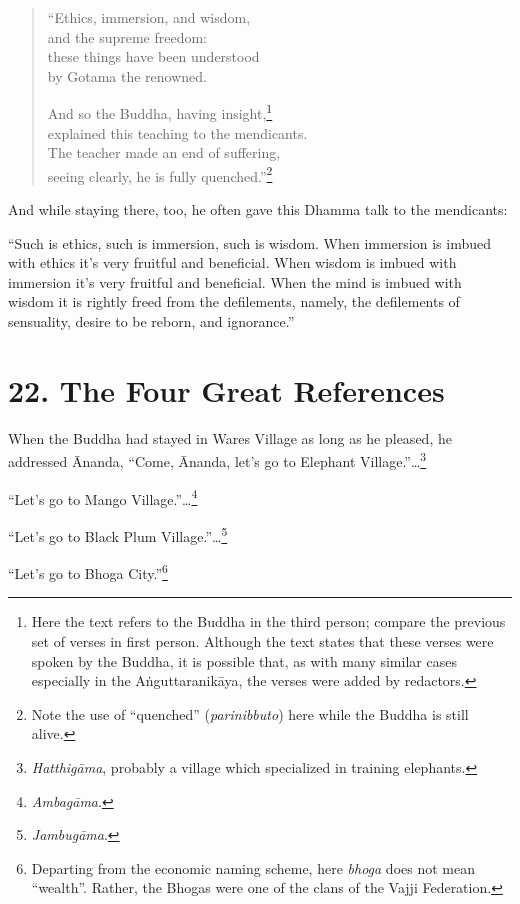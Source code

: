 \documentclass[12pt,openany]{book}%
\begin{document}
\begin{verse}%
“Ethics, immersion, and wisdom, \\
and the supreme freedom: \\
these things have been understood \\
by Gotama the renowned. 

And so the Buddha, having insight,\footnote{Here the text refers to the Buddha in the third person; compare the previous set of verses in first person. Although the text states that these verses were spoken by the Buddha, it is possible that, as with many similar cases especially in the \textsanskrit{Aṅguttaranikāya}, the verses were added by redactors. } \\
explained this teaching to the mendicants. \\
The teacher made an end of suffering, \\
seeing clearly, he is fully quenched.”\footnote{Note the use of “quenched” (\textit{parinibbuto}) here while the Buddha is still alive. } 

%
\end{verse}

And while staying there, too, he often gave this Dhamma talk to the mendicants: 

“Such is ethics, such is immersion, such is wisdom. When immersion is imbued with ethics it’s very fruitful and beneficial. When wisdom is imbued with immersion it’s very fruitful and beneficial. When the mind is imbued with wisdom it is rightly freed from the defilements, namely, the defilements of sensuality, desire to be reborn, and ignorance.” 

\section*{22. The Four Great References }

When the Buddha had stayed in Wares Village as long as he pleased, he addressed Ānanda, “Come, Ānanda, let’s go to Elephant Village.”…\footnote{\textit{\textsanskrit{Hatthigāma}}, probably a village which specialized in training elephants. } 

“Let’s go to Mango Village.”…\footnote{\textit{\textsanskrit{Ambagāma}}. } 

“Let’s go to Black Plum Village.”…\footnote{\textit{\textsanskrit{Jambugāma}}. } 

“Let’s go to Bhoga City.”\footnote{Departing from the economic naming scheme, here \textit{bhoga} does not mean “wealth”. Rather, the Bhogas were one of the clans of the Vajji Federation. } 
\end{document}

